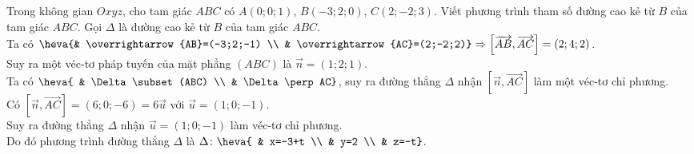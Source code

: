 \TL
\begin{ex}%
Trong không gian $Oxyz$, cho tam giác $ABC$ có $A(0;0;1)$, $B(-3;2;0)$, $C(2;-2;3)$. Viết phương trình tham số đường cao kẻ từ $B$ của tam giác $ABC$.
\loigiai
{
Gọi $\Delta$ là đường cao kẻ từ $B$ của tam giác $ABC$.\\
Ta có $\heva{& \overrightarrow{AB}=(-3;2;-1) \\ & \overrightarrow{AC}=(2;-2;2)} \Rightarrow \left[\overrightarrow{AB},\overrightarrow{AC}\right]=(2;4;2)$. \\
Suy ra một véc-tơ pháp tuyến của mặt phẳng $(ABC)$ là $\overrightarrow{n}=(1;2;1)$.\\
Ta có $\heva{ & \Delta \subset(ABC) \\ & \Delta \perp AC}$, suy ra đường thẳng $\Delta$ nhận $\left[\overrightarrow{n},\overrightarrow{AC}\right]$ làm một véc-tơ chỉ phương.\\
Có $\left[\overrightarrow{n},\overrightarrow{AC}\right]=(6;0;-6)=6\overrightarrow{u}$ với $\overrightarrow{u}=(1;0;-1)$. \\
Suy ra đường thẳng $\Delta$ nhận $\overrightarrow{u}=(1;0;-1)$ làm véc-tơ chỉ phương.\\
Do đó phương trình đường thẳng $\Delta$ là $\Delta \colon \heva{ & x=-3+t \\ & y=2 \\ & z=-t}$.
}
\end{ex}

